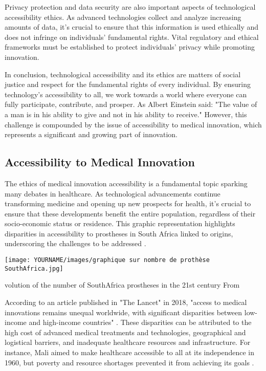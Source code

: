 Privacy protection and data security are also important aspects of technological accessibility ethics. As advanced technologies collect and analyze increasing amounts of data, it’s crucial to ensure that this information is used ethically and does not infringe on individuals' fundamental rights. Vital regulatory and ethical frameworks must be established to protect individuals' privacy while promoting innovation.

In conclusion, technological accessibility and its ethics are matters of social justice and respect for the fundamental rights of every individual. By ensuring technology's accessibility to all, we work towards a world where everyone can fully participate, contribute, and prosper. As Albert Einstein said: "The value of a man is in his ability to give and not in his ability to receive."
However, this challenge is compounded by the issue of accessibility to medical innovation, which represents a significant and growing part of innovation.

\subsection{Accessibility to Medical Innovation}

The ethics of medical innovation accessibility is a fundamental topic sparking many debates in healthcare. As technological advancements continue transforming medicine and opening up new prospects for health, it’s crucial to ensure that these developments benefit the entire population, regardless of their socio-economic status or residence. This graphic representation highlights disparities in accessibility to prostheses in South Africa linked to origins, underscoring the challenges to be addressed \cite{noauthor_exploring_nodate}.

\begin{marginfigure}[-5.5cm]
	\texttt{[image: YOURNAME/images/graphique sur nombre de prothèse SouthAfrica.jpg]}
	\caption[]Evolution of the number of SouthAfrica prostheses in the 21st century From \cite{noauthor_exploring_nodate} 
	\labfig{}
\end{marginfigure} 

According to an article published in "The Lancet" in 2018, "access to medical innovations remains unequal worldwide, with significant disparities between low-income and high-income countries" \cite{hanson_lancet_2022}. These disparities can be attributed to the high cost of advanced medical treatments and technologies, geographical and logistical barriers, and inadequate healthcare resources and infrastructure. For instance, Mali aimed to make healthcare accessible to all at its independence in 1960, but poverty and resource shortages prevented it from achieving its goals \cite{noauthor_fragility_nodate}.


